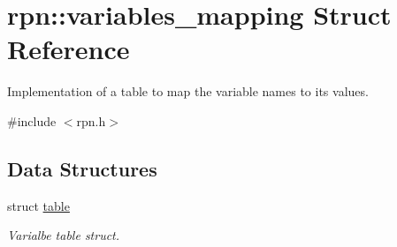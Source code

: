 \hypertarget{structrpn_1_1variables__mapping}{\section{rpn\-:\-:variables\-\_\-mapping Struct Reference}
\label{structrpn_1_1variables__mapping}
}


Implementation of a table to map the variable names to its values.  




{\ttfamily \#include $<$rpn.\-h$>$}

\subsection*{Data Structures}
\begin{DoxyCompactItemize}
\item 
struct \hyperlink{structrpn_1_1variables__mapping_1_1table}{table}
\begin{DoxyCompactList}\small\item\em Varialbe table struct. \end{DoxyCompactList}\end{DoxyCompactItemize}
